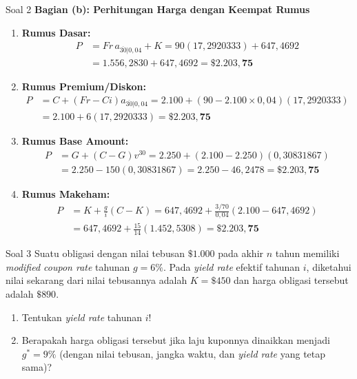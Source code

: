 \documentclass[11pt,a4paper]{article}
\begin{document}
\begin{solutionbox}{Soal 2}
\textbf{Bagian (b): Perhitungan Harga dengan Keempat Rumus}
\begin{enumerate}[label=\textbf{\arabic*.}]
    \item \textbf{Rumus Dasar:}
    \begin{align*}
        P &= Fr \, a_{\overline{30}|0{,}04} + K = 90(17{,}2920333) + 647{,}4692 \\
          &= 1.556{,}2830 + 647{,}4692 = \mathbf{\$2.203{,}75}
    \end{align*}
    \item \textbf{Rumus Premium/Diskon:}
    \begin{align*}
        P &= C + (Fr - Ci)a_{\overline{30}|0{,}04} = 2.100 + (90 - 2.100 \times 0{,}04)(17{,}2920333) \\
          &= 2.100 + 6(17{,}2920333) = \mathbf{\$2.203{,}75}
    \end{align*}
    \item \textbf{Rumus Base Amount:}
    \begin{align*}
        P &= G + (C - G)v^{30} = 2.250 + (2.100 - 2.250)(0{,}30831867) \\
          &= 2.250 - 150(0{,}30831867) = 2.250 - 46{,}2478 = \mathbf{\$2.203{,}75}
    \end{align*}
    \item \textbf{Rumus Makeham:}
    \begin{align*}
        P &= K + \frac{g}{i}(C - K) = 647{,}4692 + \frac{3/70}{0{,}04}(2.100 - 647{,}4692) \\
          &= 647{,}4692 + \frac{15}{14}(1.452{,}5308) = \mathbf{\$2.203{,}75}
    \end{align*}
\end{enumerate}
\end{solutionbox}

\vspace{1.2em}

\begin{problembox}{Soal 3}
Suatu obligasi dengan nilai tebusan $\$1.000$ pada akhir $n$ tahun memiliki \textit{modified coupon rate} tahunan $g = 6\%$. Pada \textit{yield rate} efektif tahunan $i$, diketahui nilai sekarang dari nilai tebusannya adalah $K = \$450$ dan harga obligasi tersebut adalah $\$890$.
\begin{enumerate}[label=(\alph*)]
    \item Tentukan \textit{yield rate} tahunan $i$!
    \item Berapakah harga obligasi tersebut jika laju kuponnya dinaikkan menjadi $g^* = 9\%$ (dengan nilai tebusan, jangka waktu, dan \textit{yield rate} yang tetap sama)?
\end{enumerate}
\end{problembox}
\end{document}
